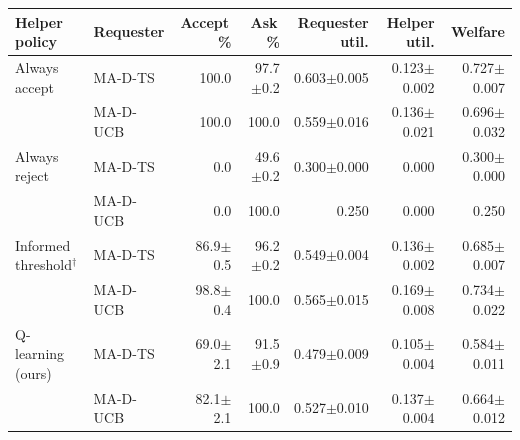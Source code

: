 \begin{tabular}{llrrrrr}
\toprule
Helper policy & Requester & Accept\,\% & Ask\,\% & Requester util. & Helper util. & Welfare \\
\midrule
Always accept & MA-D-TS & 100.0 & 97.7{\scriptsize$\pm$0.2} & 0.603{\scriptsize$\pm$0.005} & 0.123{\scriptsize$\pm$0.002} & 0.727{\scriptsize$\pm$0.007} \\
 & MA-D-UCB & 100.0 & 100.0 & 0.559{\scriptsize$\pm$0.016} & 0.136{\scriptsize$\pm$0.021} & 0.696{\scriptsize$\pm$0.032} \\
\midrule
Always reject & MA-D-TS & 0.0 & 49.6{\scriptsize$\pm$0.2} & 0.300{\scriptsize$\pm$0.000} & 0.000 & 0.300{\scriptsize$\pm$0.000} \\
 & MA-D-UCB & 0.0 & 100.0 & 0.250 & 0.000 & 0.250 \\
\midrule
Informed threshold$^{\dagger}$ & MA-D-TS & 86.9{\scriptsize$\pm$0.5} & 96.2{\scriptsize$\pm$0.2} & 0.549{\scriptsize$\pm$0.004} & 0.136{\scriptsize$\pm$0.002} & 0.685{\scriptsize$\pm$0.007} \\
 & MA-D-UCB & 98.8{\scriptsize$\pm$0.4} & 100.0 & 0.565{\scriptsize$\pm$0.015} & 0.169{\scriptsize$\pm$0.008} & 0.734{\scriptsize$\pm$0.022} \\
\midrule
Q-learning (ours) & MA-D-TS & 69.0{\scriptsize$\pm$2.1} & 91.5{\scriptsize$\pm$0.9} & 0.479{\scriptsize$\pm$0.009} & 0.105{\scriptsize$\pm$0.004} & 0.584{\scriptsize$\pm$0.011} \\
 & MA-D-UCB & 82.1{\scriptsize$\pm$2.1} & 100.0 & 0.527{\scriptsize$\pm$0.010} & 0.137{\scriptsize$\pm$0.004} & 0.664{\scriptsize$\pm$0.012} \\
\bottomrule
\end{tabular}

